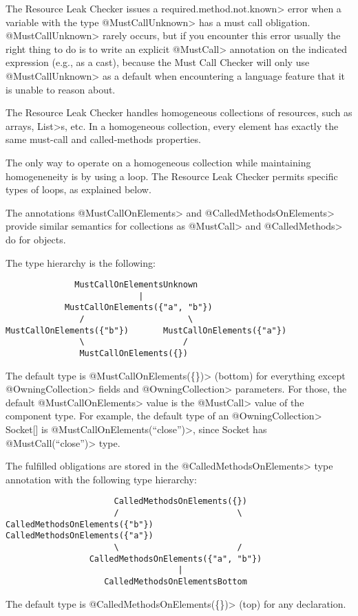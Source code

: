 The Resource Leak Checker issues a \<required.method.not.known> error
when a variable with the type \<@MustCallUnknown> has a must call obligation.
\<@MustCallUnknown> rarely occurs, but if you encounter this error usually
the right thing to do is to write an explicit \<@MustCall> annotation
on the indicated expression (e.g., as a cast), because the Must Call Checker
will only use \<@MustCallUnknown> as a default when encountering a language
feature that it is unable to reason about.



The Resource Leak Checker handles homogeneous collections of resources,
such as arrays, \<List>s, etc.  In a homogeneous collection, every element
has exactly the same must-call and called-methods properties.

The only way to operate on a homogeneous collection while maintaining
homogeneneity is by using a loop.  The Resource Leak Checker permits
specific types of loops, as explained below.



The annotations
\<@MustCallOnElements> and \<@CalledMethodsOnElements> provide similar
semantics for collections as \<@MustCall> and \<@CalledMethods> do for
objects.

The type hierarchy is the following:

\begin{verbatim}
              MustCallOnElementsUnknown
                           |
            MustCallOnElements({"a", "b"})
               /                     \
MustCallOnElements({"b"})       MustCallOnElements({"a"})
               \                    /
               MustCallOnElements({})
\end{verbatim}
The default type is \<@MustCallOnElements(\{\})> (bottom) for everything except \<@OwningCollection> fields and \<@OwningCollection> parameters. For those, the default \<@MustCallOnElements> value is the \<@MustCall> value of the component type. For example, the default type of an \<@OwningCollection> Socket[] is \<@MustCallOnElements({``close''})>, since Socket has \<@MustCall(``close'')> type.

The fulfilled obligations are stored in the \<@CalledMethodsOnElements> type annotation with the following type hierarchy:
\begin{verbatim}
                      CalledMethodsOnElements({})
                      /                        \
CalledMethodsOnElements({"b"})           CalledMethodsOnElements({"a"})
                      \                        /
                 CalledMethodsOnElements({"a", "b"})
                                   |
                    CalledMethodsOnElementsBottom
\end{verbatim}
The default type is \<@CalledMethodsOnElements(\{\})> (top) for any declaration.


